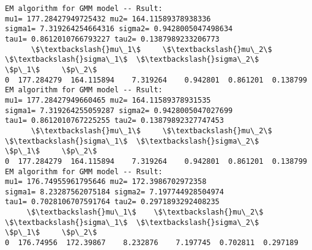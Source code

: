 \documentclass[11pt]{article}
\begin{document}
    \begin{Verbatim}[commandchars=\\\{\}]
EM algorithm for GMM model -- Rsult:
mu1= 177.28427949725432 mu2= 164.11589378938336
sigma1= 7.319264254664316 sigma2= 0.9428005047498634
tau1= 0.8612010766793227 tau2= 0.1387989233206773
      \$\textbackslash{}mu\_1\$     \$\textbackslash{}mu\_2\$  \$\textbackslash{}sigma\_1\$  \$\textbackslash{}sigma\_2\$     \$p\_1\$     \$p\_2\$
0  177.284279  164.115894    7.319264    0.942801  0.861201  0.138799
EM algorithm for GMM model -- Rsult:
mu1= 177.28427949660465 mu2= 164.11589378931535
sigma1= 7.319264255059287 sigma2= 0.9428005047027699
tau1= 0.8612010767225255 tau2= 0.13879892327747453
      \$\textbackslash{}mu\_1\$     \$\textbackslash{}mu\_2\$  \$\textbackslash{}sigma\_1\$  \$\textbackslash{}sigma\_2\$     \$p\_1\$     \$p\_2\$
0  177.284279  164.115894    7.319264    0.942801  0.861201  0.138799
EM algorithm for GMM model -- Rsult:
mu1= 176.74955961795646 mu2= 172.3986702972358
sigma1= 8.23287562075184 sigma2= 7.197744928504974
tau1= 0.7028106707591764 tau2= 0.2971893292408235
     \$\textbackslash{}mu\_1\$    \$\textbackslash{}mu\_2\$  \$\textbackslash{}sigma\_1\$  \$\textbackslash{}sigma\_2\$     \$p\_1\$     \$p\_2\$
0  176.74956  172.39867    8.232876    7.197745  0.702811  0.297189
    \end{Verbatim}

    \begin{center}
    \end{center}
    { \hspace*{\fill} \\}
    
    \begin{center}
    \end{center}
    { \hspace*{\fill} \\}
    
    \begin{center}
    \end{center}
    { \hspace*{\fill} \\}
    
    \begin{center}
    \end{center}
    { \hspace*{\fill} \\}
    
\end{document}
